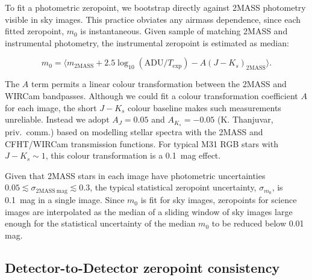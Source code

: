 \documentclass[iop]{emulateapj}
\begin{document}
To fit a photometric zeropoint, we bootstrap directly against 2MASS photometry visible in sky images.
This practice obviates any airmass dependence, since each fitted zeropoint, $m_0$ is instantaneous.
Given sample of matching 2MASS and instrumental photometry, the instrumental zeropoint is estimated as median:

\begin{equation}
  \label{eq:photcal}
  m_0 = \langle m_\mathrm{2MASS} + 2.5 \log_{10}(\mathrm{ADU}/T_\mathrm{exp}) - A (J-K_s)_\mathrm{2MASS} \rangle.
\end{equation}

The $A$ term permits a linear colour transformation between the 2MASS and WIRCam bandpasses.
Although we could fit a colour transformation coefficient $A$ for each image, the short $J-K_s$ colour baseline makes such measurements unreliable.
Instead we adopt $A_J = 0.05$ and $A_{K_s} = -0.05$ (K. Thanjuvar, priv.\ comm.) based on modelling stellar spectra with the 2MASS and CFHT/WIRCam transmission functions.
For typical M31 RGB stars with $J-K_s\sim 1$, this colour transformation is a 0.1~mag effect.

Given that 2MASS stars in each image have photometric uncertainties $0.05 \lesssim \sigma_{\mathrm{2MASS~mag}} \lesssim 0.3$, the typical statistical zeropoint uncertainty, $\sigma_{m_0}$, is 0.1~mag in a single image.
Since $m_0$ is fit for sky images, zeropoints for science images are interpolated as the median of a sliding window of sky images large enough for the statistical uncertainty of the median $m_0$ to be reduced below 0.01 mag.

\subsection{Detector-to-Detector zeropoint consistency}
\label{sec:detector_zp}
\end{document}
